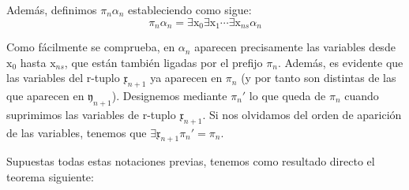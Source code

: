 Además, definimos $\pi_n\alpha_n$ estableciendo como sigue:
\begin{equation}
    \pi_n\alpha_n = \exists \text{x}_0 \exists \text{x}_1 \cdots \exists \text{x}_{ns} \alpha_n
\end{equation}

Como fácilmente se comprueba, en $\alpha_n$ aparecen precisamente las variables desde $\text{x}_0$ hasta $\text{x}_{ns}$, que están también ligadas por el prefijo $\pi_n$. 
Además, es evidente que las variables del r-tuplo $\mathfrak{x}_{n+1}$ ya aparecen en $\pi_n$ (y por tanto son distintas de las que aparecen en $\mathfrak{y}_{n+1}$).
Designemos mediante $\pi_n'$ lo que queda de $\pi_n$ cuando suprimimos las variables de r-tuplo $\mathfrak{x}_{n+1}$. Si nos olvidamos del orden de aparición de las variables,
tenemos que $\exists \mathfrak{x}_{n+1} \pi_n' = \pi_n$.

Supuestas todas estas notaciones previas, tenemos como resultado directo el teorema siguiente:

